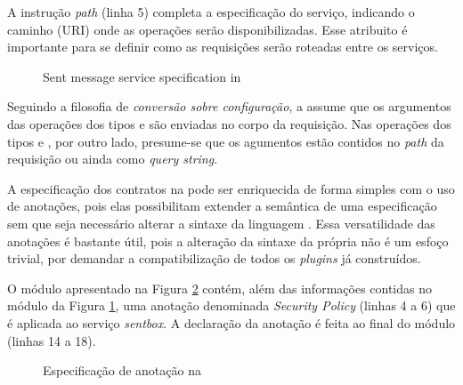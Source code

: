 A instrução \emph{path} (linha 5) completa a especificação do serviço, indicando
o caminho (URI) onde as operações serão disponibilizadas. Esse atribuito é importante para se definir
como as requisições serão roteadas entre os serviços.

\vspace{6mm}

\begin{figure}[htb]
\begin{small}

\end{small}
\caption{Sent message service specification in \neoidl}
\label{lst:sentmessage-neo}
\end{figure}

Seguindo a filosofia de \emph{conversão sobre configuração}, a \neoidl{} assume
que os argumentos das operações dos tipos  e  são
enviadas no corpo da requisição. Nas operações dos tipos  e
, por outro lado, presume-se que os agumentos estão contidos no \emph{path} da requisição ou ainda
como \textit{query string}.

A especificação dos contratos na \neoidl{} pode ser enriquecida de forma simples
com o uso de anotações, pois elas possibilitam extender a semântica
de uma especificação sem que seja necessário alterar a sintaxe da
linguagem \neoidl{}. Essa versatilidade das anotações é bastante útil, pois a
alteração da sintaxe da própria \neoidl{} não é um esfoço trivial, por demandar
a compatibilização de todos os \textit{plugins} já construídos.

O módulo apresentado na Figura \ref{lst:annotationNeoIDL} contém, além das
informações contidas no módulo da Figura \ref{lst:sentmessage-neo}, uma anotação
denominada \emph{Security Policy} (linhas 4 a 6) que é aplicada ao serviço
\emph{sentbox}.
A declaração da anotação é feita ao final do módulo (linhas 14 a 18).

\vspace{6mm}
 
\begin{figure}[htb]
\begin{small}

\vspace{-.5cm}
\end{small}
\caption{Especificação de anotação na \neoidl{}}
\label{lst:annotationNeoIDL}
\end{figure}

